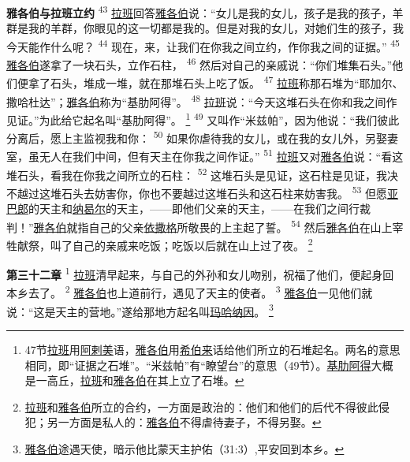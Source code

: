 \textbf{雅各伯与拉班立约\quad}
\textsuperscript{43}
\uline{拉班}回答\uline{雅各伯}说：“女儿是我的女儿，孩子是我的孩子，羊群是我的羊群，你眼见的这一切都是我的。但是对我的女儿，对她们生的孩子，我今天能作什么呢？
\textsuperscript{44}
现在，来，让我们在你我之间立约，作你我之间的证据。”
\textsuperscript{45}
\uline{雅各伯}遂拿了一块石头，立作石柱，
\textsuperscript{46}
然后对自己的亲戚说：“你们堆集石头。”他们便拿了石头，堆成一堆，就在那堆石头上吃了饭。
\textsuperscript{47}
\uline{拉班}称那石堆为“耶加尔、撒哈杜达”；\uline{雅各伯}称为“基肋阿得”。
\textsuperscript{48}
\uline{拉班}说：“今天这堆石头在你和我之间作见证。”为此给它起名叫“基肋阿得”。
\footnote{47节\uline{拉班}用\uline{阿剌美}语，\uline{雅各伯}用\uline{希伯来}话给他们所立的石堆起名。两名的意思相同，即“证据之石堆”。“米兹帕”有“瞭望台”的意思（49节）。\uline{基肋阿得}大概是一高丘，\uline{拉班}和\uline{雅各伯}在其上立了石堆。}
\textsuperscript{49}
又叫作“米兹帕”，因为他说：“我们彼此分离后，愿上主监视我和你：
\textsuperscript{50}
如果你虐待我的女儿，或在我的女儿外，另娶妻室，虽无人在我们中间，但有天主在你我之间作证。”
\textsuperscript{51}
\uline{拉班}又对\uline{雅各伯}说：“看这堆石头，看我在你我之间所立的石柱：
\textsuperscript{52}
这堆石头是见证，这石柱是见证，我决不越过这堆石头去妨害你，你也不要越过这堆石头和这石柱来妨害我。
\textsuperscript{53}
但愿\uline{亚巴郎}的天主和\uline{纳曷尔}的天主，——即他们父亲的天主，——在我们之间行裁判！”\uline{雅各伯}就指自己的父亲\uline{依撒格}所敬畏的上主起了誓。
\textsuperscript{54}
然后\uline{雅各伯}在山上宰牲献祭，叫了自己的亲戚来吃饭；吃饭以后就在山上过了夜。
\footnote{\uline{拉班}和\uline{雅各伯}所立的合约，一方面是政治的：他们和他们的后代不得彼此侵犯；另一方面是私人的：\uline{雅各伯}不得虐待妻子，不得另娶。}

\textbf{第三十二章\quad}
\textsuperscript{1}
\uline{拉班}清早起来，与自己的外孙和女儿吻别，祝福了他们，便起身回本乡去了。
\textsuperscript{2}
\uline{雅各伯}也上道前行，遇见了天主的使者。
\textsuperscript{3}
\uline{雅各伯}一见他们就说：“这是天主的营地。”遂给那地方起名叫\uline{玛哈}\uline{纳因}。
\footnote{\uline{雅各伯}途遇天使，暗示他比蒙天主护佑（31:3）,平安回到本乡。}

